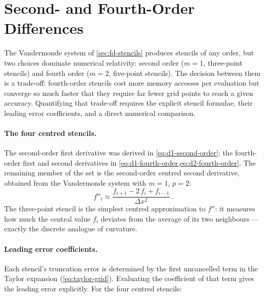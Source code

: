 \section{Second- and Fourth-Order Differences}
\label{sec:fd-orders}

The Vandermonde system of \cref{sec:fd-stencils} produces stencils of any
order, but two choices dominate numerical relativity: second order ($m = 1$,
three-point stencils) and fourth order ($m = 2$, five-point stencils).  The
decision between them is a trade-off: fourth-order stencils cost more
memory accesses per evaluation but converge so much faster that they require
far fewer grid points to reach a given accuracy.  Quantifying that trade-off
requires the explicit stencil formulae, their leading error coefficients,
and a direct numerical comparison.

\paragraph{The four centred stencils.}

The second-order first derivative was derived in
\cref{eq:d1-second-order}; the fourth-order first and second derivatives
in \cref{eq:d1-fourth-order,eq:d2-fourth-order}.  The remaining member of
the set is the second-order centred second derivative, obtained from the
Vandermonde system with $m = 1$, $p = 2$:
%
\begin{equation}
  f''_i \approx \frac{f_{i+1} - 2\,f_i + f_{i-1}}{\Delta x^2} \,.
  \label{eq:d2-second-order}
\end{equation}
%
The three-point stencil is the simplest centred approximation to $f''$: it
measures how much the central value $f_i$ deviates from the average of its
two neighbours --- exactly the discrete analogue of curvature.

\paragraph{Leading error coefficients.}

Each stencil's truncation error is determined by the first uncancelled term
in the Taylor expansion (\cref{eq:taylor-grid}).  Evaluating the coefficient
of that term gives the leading error explicitly.  For the four centred
stencils:

